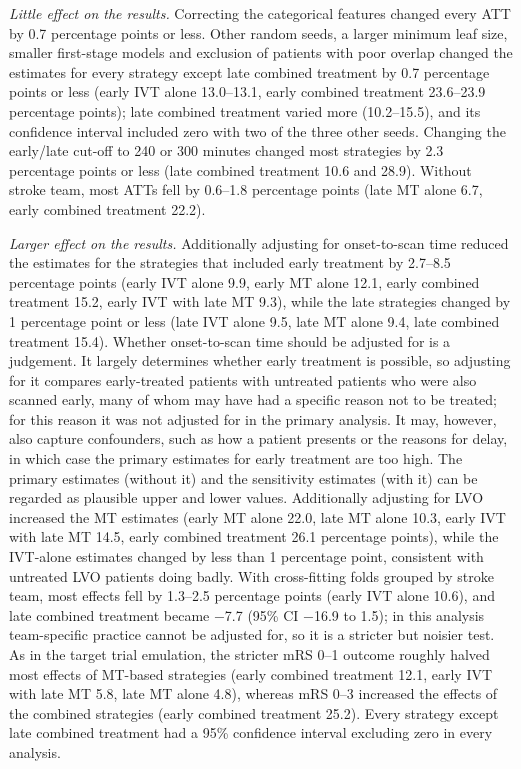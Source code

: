 \textit{Little effect on the results.} Correcting the categorical features changed every ATT by 0.7 percentage points or less. Other random seeds, a larger minimum leaf size, smaller first-stage models and exclusion of patients with poor overlap changed the estimates for every strategy except late combined treatment by 0.7 percentage points or less (early IVT alone 13.0--13.1, early combined treatment 23.6--23.9 percentage points); late combined treatment varied more (10.2--15.5), and its confidence interval included zero with two of the three other seeds. Changing the early/late cut-off to 240 or 300 minutes changed most strategies by 2.3 percentage points or less (late combined treatment 10.6 and 28.9). Without stroke team, most ATTs fell by 0.6--1.8 percentage points (late MT alone 6.7, early combined treatment 22.2).

\textit{Larger effect on the results.} Additionally adjusting for onset-to-scan time reduced the estimates for the strategies that included early treatment by 2.7--8.5 percentage points (early IVT alone 9.9, early MT alone 12.1, early combined treatment 15.2, early IVT with late MT 9.3), while the late strategies changed by 1 percentage point or less (late IVT alone 9.5, late MT alone 9.4, late combined treatment 15.4). Whether onset-to-scan time should be adjusted for is a judgement. It largely determines whether early treatment is possible, so adjusting for it compares early-treated patients with untreated patients who were also scanned early, many of whom may have had a specific reason not to be treated; for this reason it was not adjusted for in the primary analysis. It may, however, also capture confounders, such as how a patient presents or the reasons for delay, in which case the primary estimates for early treatment are too high. The primary estimates (without it) and the sensitivity estimates (with it) can be regarded as plausible upper and lower values. Additionally adjusting for LVO increased the MT estimates (early MT alone 22.0, late MT alone 10.3, early IVT with late MT 14.5, early combined treatment 26.1 percentage points), while the IVT-alone estimates changed by less than 1 percentage point, consistent with untreated LVO patients doing badly. With cross-fitting folds grouped by stroke team, most effects fell by 1.3--2.5 percentage points (early IVT alone 10.6), and late combined treatment became $-$7.7 (95\% CI $-$16.9 to 1.5); in this analysis team-specific practice cannot be adjusted for, so it is a stricter but noisier test. As in the target trial emulation, the stricter mRS 0--1 outcome roughly halved most effects of MT-based strategies (early combined treatment 12.1, early IVT with late MT 5.8, late MT alone 4.8), whereas mRS 0--3 increased the effects of the combined strategies (early combined treatment 25.2). Every strategy except late combined treatment had a 95\% confidence interval excluding zero in every analysis.

